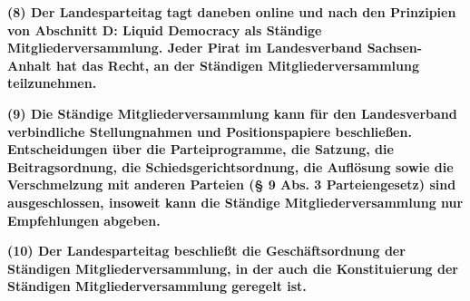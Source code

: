 {\textbf{(8) Der Landesparteitag tagt daneben online und nach den Prinzipien von Abschnitt D: Liquid Democracy als Ständige Mitgliederversammlung. Jeder Pirat im Landesverband Sachsen-Anhalt hat das Recht, an der Ständigen Mitgliederversammlung teilzunehmen.}

\textbf{(9) Die Ständige Mitgliederversammlung kann für den Landesverband verbindliche Stellungnahmen und Positionspapiere beschließen. Entscheidungen über die Parteiprogramme, die Satzung, die Beitragsordnung, die Schiedsgerichtsordnung, die Auflösung sowie die Verschmelzung mit anderen Parteien (§ 9 Abs. 3 Parteiengesetz) sind ausgeschlossen, insoweit kann die Ständige Mitgliederversammlung nur Empfehlungen abgeben.}

\textbf{(10) Der Landesparteitag beschließt die Geschäftsordnung der Ständigen Mitgliederversammlung, in der auch die Konstituierung der Ständigen Mitgliederversammlung geregelt ist.}}

